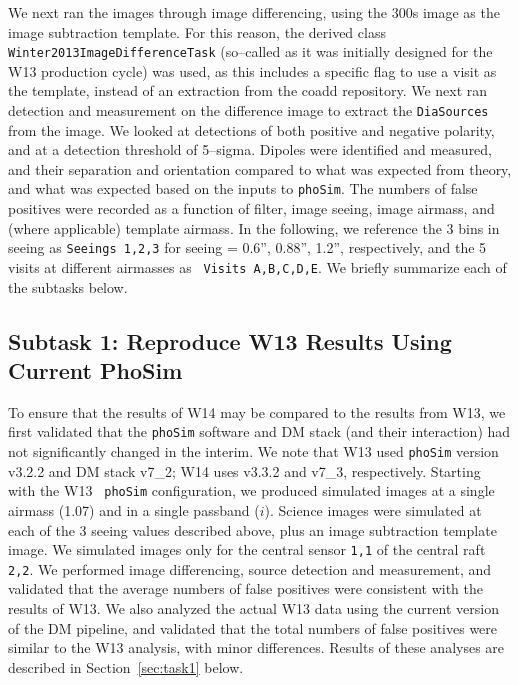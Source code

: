 \documentclass[prd, nofootinbib, floatfix, 11pt, tightenlines, times]{article}
\begin{document}
We next ran the images through image differencing, using the 300s
image as the image subtraction template.  For this reason, the derived
class {\tt Winter2013ImageDifferenceTask} (so--called as it was
initially designed for the W13 production cycle) was used, as this
includes a specific flag to use a visit as the template, instead of an
extraction from the coadd repository.  We next ran detection and
measurement on the difference image to extract the {\tt DiaSources}
from the image.  We looked at detections of both positive and negative
polarity, and at a detection threshold of 5--sigma.  Dipoles were
identified and measured, and their separation and orientation compared
to what was expected from theory, and what was expected based on the
inputs to {\tt phoSim}.  The numbers of false positives were recorded
as a function of filter, image seeing, image airmass, and (where
applicable) template airmass.  In the following, we reference the 3
bins in seeing as {\tt Seeings 1,2,3} for seeing = 0.6'', 0.88'',
1.2'', respectively, and the 5 visits at different airmasses as {\tt
  Visits A,B,C,D,E}.  We briefly summarize each of the subtasks below.

\subsection{Subtask 1: Reproduce W13 Results Using Current PhoSim}

To ensure that the results of W14 may be compared to the results from
W13, we first validated that the {\tt phoSim} software and DM stack
(and their interaction) had not significantly changed in the interim.
We note that W13 used {\tt phoSim} version v3.2.2 and DM stack v7\_2;
W14 uses v3.3.2 and v7\_3, respectively.  Starting with the W13 {\tt
  phoSim} configuration, we produced simulated images at a single
airmass (1.07) and in a single passband ($i$).  Science images were
simulated at each of the 3 seeing values described above, plus an
image subtraction template image.  We simulated images only for the
central sensor {\tt 1,1} of the central raft {\tt 2,2}.  We performed
image differencing, source detection and measurement, and validated
that the average numbers of false positives were consistent with the
results of W13.  We also analyzed the actual W13 data using the
current version of the DM pipeline, and validated that the total
numbers of false positives were similar to the W13 analysis, with
minor differences.  Results of these analyses are described in
Section~\ref{sec:task1} below.
\end{document}
